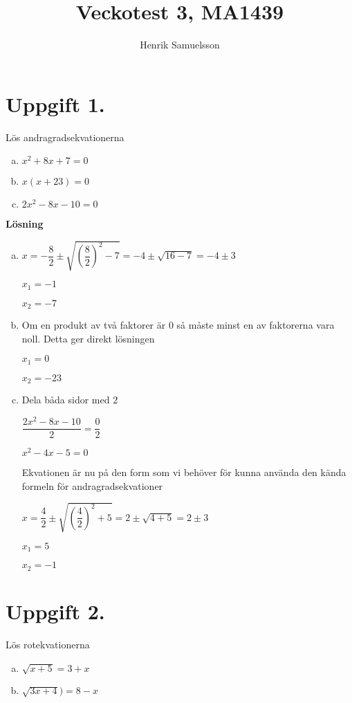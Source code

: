 \documentclass{article}
\begin{document}
\title{Veckotest 3, MA1439}
\author{Henrik Samuelsson}
\maketitle

\section*{Uppgift 1.}
Lös andragradsekvationerna
\begin{enumerate}[(a)]
\item $x^2+8x+7=0$
\item $x(x+23)=0$
\item $2x^2-8x-10=0$
\end{enumerate}

\textbf{Lösning}
\begin{enumerate}[(a)]
\item
$x=-\dfrac{8}{2}\pm\sqrt{\left(\dfrac{8}{2}\right)^2-7}=-4\pm\sqrt{16-7}=-4\pm3$

$x_1 = -1$

$x_2 = -7$

\item
Om en produkt av två faktorer är $0$ så måste minst en av faktorerna vara noll. Detta ger direkt lösningen

$x_1 = 0$

$x_2 = -23$

\item
Dela båda sidor med $2$

$\dfrac{2x^2-8x-10}{2}=\dfrac{0}{2}$

$x^2-4x-5 = 0$

Ekvationen är nu på den form som vi behöver för kunna använda den kända formeln för andragradsekvationer

$x=\dfrac{4}{2}\pm\sqrt{\left(\dfrac{4}{2}\right)^2+5}=2\pm\sqrt{4+5}=2\pm3$

$x_1 = 5$

$x_2 = -1$
\end{enumerate}

\section*{Uppgift 2.}
Lös rotekvationerna
\begin{enumerate}[(a)]
\item $\sqrt{x+5}=3+x$
\item $\sqrt{3x+4})=8-x$
\end{enumerate}
\end{document}
